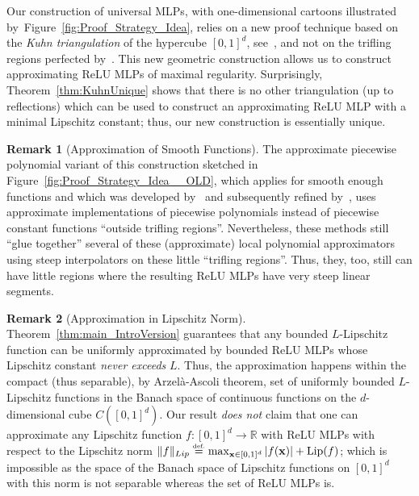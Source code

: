 \documentclass{article}
\numberwithin{equation}{section}
\theoremstyle{definition}
\newtheorem{remark}{Remark}[section]
\newcommand{\eqdef}{\ensuremath{\stackrel{\mbox{\upshape\tiny def.}}{=}}}
\begin{document}
Our construction of universal MLPs, with one-dimensional cartoons illustrated by~Figure~\ref{fig:Proof_Strategy_Idea}, relies on a new proof technique based on the \textit{Kuhn triangulation} of the hypercube $[0,1]^d$, see~\cite{KuhnTriangulationPaper_1960}, and not on the trifling regions perfected by~\cite{ShenYangZhang_JMPA_OptApprx_ReLU}.  
This new geometric construction allows us to construct approximating ReLU MLPs of maximal regularity.  Surprisingly, Theorem~\ref{thm:KuhnUnique} shows that there is no other triangulation (up to reflections) which can be used to construct an approximating ReLU MLP with a minimal Lipschitz constant; thus, our new construction is essentially unique.

\begin{remark}[Approximation of Smooth Functions]
\label{rem:On__fig:Proof_Strategy_Idea}
The approximate piecewise polynomial variant of this construction sketched in Figure~\ref{fig:Proof_Strategy_Idea__OLD}, which applies for smooth enough functions and which was developed by~\cite{yarotsky_OptimalApproximation_VeryDeep_PMLP_COLT_2018} and subsequently refined by~\cite{yarotsky2020phase,petersen2018optimal,lu2021deep}, uses approximate implementations of piecewise polynomials instead of piecewise constant functions ``outside trifling regions''.   Nevertheless, these methods still ``glue together'' several of these (approximate) local polynomial approximators using steep interpolators on these little ``trifling regions''.  Thus, they, too, still can have little regions where the resulting ReLU MLPs have very steep linear segments.
\end{remark}

\begin{remark}[Approximation in Lipschitz Norm]
\label{rem:LipImpossible}
Theorem~\ref{thm:main_IntroVersion} guarantees that any bounded $L$-Lipschitz function can be uniformly approximated by bounded ReLU MLPs whose Lipschitz constant \textit{never exceeds} $L$. Thus, the approximation happens within the compact (thus separable), by Arzel\`a-Ascoli theorem, set of uniformly bounded $L$-Lipschitz functions in the Banach space of continuous functions on the $d$-dimensional cube $C([0,1]^d)$. 
Our result \textit{does not} claim that one can 
approximate any Lipschitz function $f:[0,1]^d\to \mathbb{R}$ with ReLU MLPs with respect to the Lipschitz norm $\|f\|_{Lip} \eqdef \max_{\mathbf{x} \in [0,1]^d} |f(\mathbf{x})| + \operatorname{Lip}(f)$; which is impossible as the space of the Banach space of Lipschitz functions on $[0,1]^d$ with this norm is not separable whereas the set of ReLU MLPs is.
\end{remark}
\end{document}

